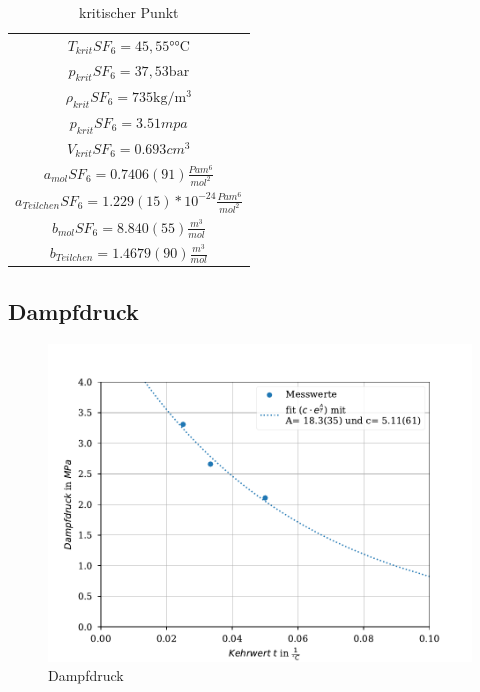 \documentclass[11pt, a4paper]{article}
\begin{document}
    \begin{table}
        \centering
        \begin{tabular}{c}
            $T_{krit} SF_6 = 45,55 \si{\degree \celsius}$ \cite{SH6} \\
            $p_{krit} SF_6 = 37,53 \si{\bar}$ \cite{SH6} \\
            $\rho_{krit} SF_6 = 735 \si{\kilogram \per \meter \cubed}$ \cite{SH6} \\
            $p_{krit} SF_6 = 3.51 mpa$ \\
            $V_{krit} SF_6 = 0.693 cm^3$ \\
            $a_{mol} SF_6 = 0.7406(91) \frac{Pa m^6}{mol^2}$\\
            $a_{Teilchen} SF_6 = 1.229(15)*10^{-24} \frac{Pa m^6}{mol^2}$\\
            $b_{mol} SF_6 = 8.840(55)\frac{m^3}{mol}$\\
            $b_{Teilchen} = 1.4679(90)\frac{m^3}{mol}$\\
            
            
        \end{tabular}
        \caption{kritischer Punkt}
        \label{tab:krit}
    \end{table}

    \subsection{Dampfdruck}
    \begin{figure}
        \centering
        \includegraphics[width=\textwidth]{./Plots/dampf.pdf}

        \caption{Dampfdruck}
        \label{fig:dampf}
    \end{figure}
\end{document}
